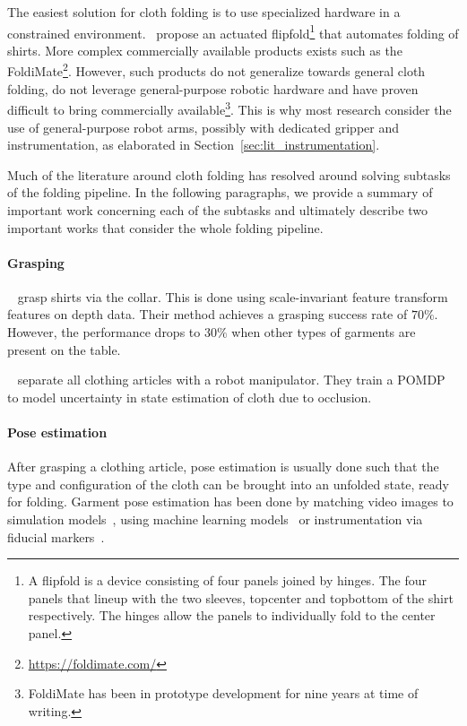 \documentclass[\home/main.tex]{subfiles}
\begin{document}
The easiest solution for cloth folding is to use specialized hardware in a constrained environment.~\Textcite{Nair2013} propose an actuated flipfold\footnote{A flipfold is a device consisting of four panels joined by hinges. The four panels that lineup with the two sleeves, topcenter and topbottom of the shirt respectively. The hinges allow the panels to individually fold to the center panel.} that automates folding of shirts. More complex commercially available products exists such as the FoldiMate\footnote{\url{https://foldimate.com/}}. However, such products do not generalize towards general cloth folding, do not leverage general-purpose robotic hardware and have proven difficult to bring commercially available\footnote{FoldiMate has been in prototype development for nine years at time of writing.}. This is why most research consider the use of general-purpose robot arms, possibly with dedicated gripper and instrumentation, as elaborated in Section~\ref{sec:lit_instrumentation}. 

Much of the literature around cloth folding has resolved around solving subtasks of the folding pipeline. In the following paragraphs, we provide a summary of important work concerning each of the subtasks and ultimately describe two important works that consider the whole folding pipeline.

\paragraph{Grasping}
	~\autocite{Ramisa2012} grasp shirts via the collar. This is done using scale-invariant feature transform features on depth data. Their method achieves a grasping success rate of $70\%$. However, the performance drops to $30\%$ when other types of garments are present on the table.

	~\autocite{Monso2012} separate all clothing articles with a robot manipulator. They train a \acrshort{POMDP} to model uncertainty in state estimation of cloth due to occlusion.


\paragraph{Pose estimation}
	After grasping a clothing article, pose estimation is usually done such that the type and configuration of the cloth can be brought into an unfolded state, ready for folding. Garment pose estimation has been done by matching video images to simulation models~\autocite{Kita2002}, using machine learning models~\autocite{Li2014, li2014volum} or instrumentation via fiducial markers~\autocite{Bersch2011}.
\end{document}
